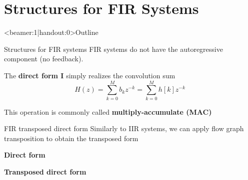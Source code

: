 \documentclass[10pt, aspectratio=169, handout]{beamer}
\begin{document}
\section{Structures for FIR Systems}
\begin{frame}<beamer:1|handout:0>{Outline}
\tableofcontents[currentsection]
\end{frame}

\begin{frame}{Structures for FIR systems}
FIR systems do not have the autoregressive component (no feedback). 

The \textbf{direct form I} simply realizes the convolution sum
\begin{equation*}
H(z) = \sum_{k = 0}^Mb_kz^{-k} = \sum_{k = 0}^M h[k]z^{-k}
\end{equation*}

\begin{center}
	\resizebox{\textwidth}{!}{}
\end{center}

This operation is commonly called\textbf{ multiply-accumulate (MAC)}

\end{frame}

\begin{frame}{FIR transposed direct form}
Similarly to IIR systems, we can apply flow graph transposition to obtain the transposed form

\textbf{Direct form}
\begin{center}
	\resizebox{0.7\textwidth}{!}{}
\end{center}

\textbf{Transposed direct form}
\begin{center}
	\resizebox{0.7\textwidth}{!}{}
\end{center}

\end{frame}
\end{document}
